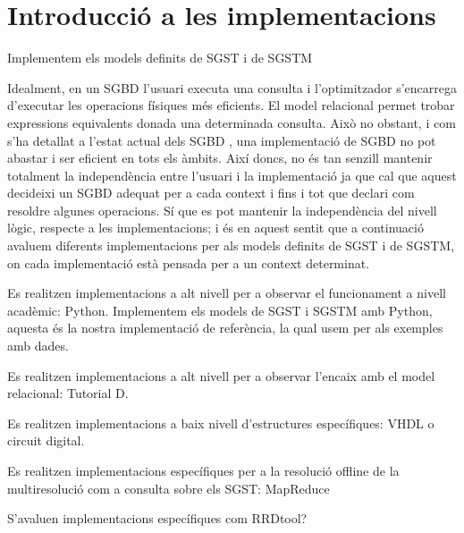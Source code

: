 

\chapter{Introducció a les implementacions}


Implementem els models definits de \gls{SGST} i de \gls{SGSTM}



Idealment, en un \gls{SGBD} l'usuari executa una consulta i
l'optimitzador s'encarrega d'executar les operacions físiques més
eficients. El model relacional permet trobar expressions equivalents
donada una determinada consulta. Això no obstant, i com s'ha detallat
a l'estat actual dels \gls{SGBD} , una implementació de
\gls{SGBD} no pot abastar i ser eficient en tots els àmbits. Així
doncs, no és tan senzill mantenir totalment la independència entre
l'usuari i la implementació ja que cal que aquest decideixi un
\gls{SGBD} adequat per a cada context i fins i tot que declari com
resoldre algunes operacions. Sí que es pot mantenir la independència
del nivell lògic, respecte a les implementacions; i és en aquest
sentit que a continuació avaluem diferents implementacions per als
models definits de \gls{SGST} i de \gls{SGSTM}, on cada implementació
està pensada per a un context determinat.





Es realitzen implementacions a alt nivell per a observar el funcionament a nivell acadèmic: Python. Implementem els models de \gls{SGST} i \gls{SGSTM} amb Python, aquesta és la nostra implementació de referència, la qual usem per als exemples amb dades.

Es realitzen implementacions a alt nivell per a observar l'encaix amb el model relacional: Tutorial D.

Es realitzen implementacions a baix nivell d'estructures específiques: VHDL o circuit digital.


Es realitzen implementacions específiques per a la resolució offline de la multiresolució com a consulta sobre els \gls{SGST}: MapReduce


S'avaluen implementacions específiques com RRDtool?






